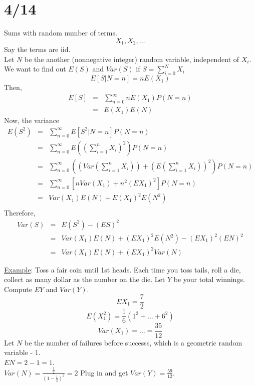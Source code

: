 \section*{4/14}
  Sums with random number of terms.
  $$
    X_1, X_2, \ldots
  $$
  Say the terms are iid.\\
  Let $N$ be the another (nonnegative integer) random variable, 
  independent of $X_i$.\\
  We want to find out $E(S)$ and $Var(S)$ if $S = \sum_{i = 0}^NX_i$\\
  $$
    E[S| N = n] = nE(X_1)
  $$
  Then,
  \begin{eqnarray*}
    E[S] & = & \sum_{n = 0}^{\infty}nE(X_1)P(N=n)\\
      & = & E(X_1)E(N)
  \end{eqnarray*}
  Now, the variance
  \begin{eqnarray*}
    E(S^2) & = & \sum_{n = 0}^{\infty} E[S^2 | N = n]P(N = n)\\
      & = & \sum_{n = 0}^{\infty} E((\sum_{i = 1}^n X_i)^2)P(N= n)\\
      & = & \sum_{n = 0}^{\infty} ((Var(\sum_{i = 1}^n X_i))+(E(\sum_{i = 1}^nX_i))^2)P(N=n)\\
      & = & \sum_{n = 0}^{\infty} [nVar(X_1) + n^2(EX_1)^2]P(N = n)\\
      & = & Var(X_1)E(N) + E(X_1)^2 E(N^2)\\
  \end{eqnarray*}
  Therefore,
  \begin{eqnarray*}
    Var(S) & = & E(S^2) - (ES)^2\\
      & = & Var(X_1)E(N) + (EX_1)^2E(N^2) - (EX_1)^2(EN)^2\\
      & = & Var(X_1)E(N) + (EX_1)^2Var(N)
  \end{eqnarray*}

  \noindent\underline{Example}: Toss a fair coin until 1st heads. Each time
     you toss tails, roll a die, collect as many dollar as the number on the 
     die. Let $Y$ be your total winnings. Compute $EY$ and $Var(Y)$.\\

     $$
      EX_1 = \frac{7}{2}
     $$
     $$
      E(X_1^2) = \frac{1}{6}(1^2 + \ldots + 6^2)
     $$
     $$
      Var(X_1) = \ldots = \frac{35}{12}
     $$
     Let $N$ be the number of failures before successs, which is a geometric
     random variable - 1.\\
     $EN = 2 - 1 = 1$.\\
     $Var(N) = \frac{\frac{1}{2}}{\left(1- \frac{1}{2}\right)^2} = 2$
     Plug in and get $Var(Y) = \frac{59}{12}$.

